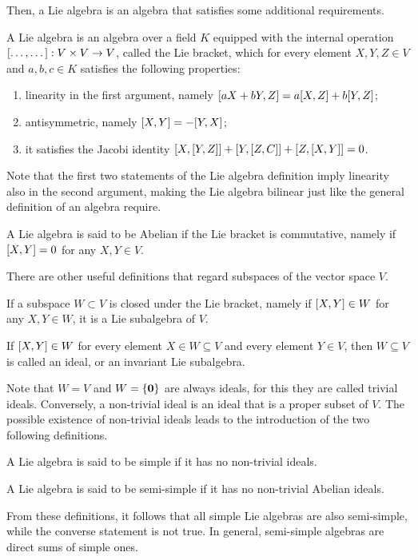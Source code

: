 Then, a Lie algebra is an algebra that satisfies some additional requirements.
\begin{defn}
    A Lie algebra is an algebra over a field $K$ equipped with the internal operation $[\dots,\dots] : V \times V \to V$, called the Lie bracket, which for every element $X,Y,Z \in V$ and $a,b,c \in K$ satisfies the following properties:
    \begin{enumerate}
        \item linearity in the first argument, namely $[aX + bY,Z] = a[X,Z] + b[Y,Z]$;
        \item antisymmetric, namely $[X,Y] = - [Y,X]$;
        \item it satisfies the Jacobi identity $[X,[Y,Z]] + [Y,[Z,C]] + [Z,[X,Y]] = 0$.
    \end{enumerate}
\end{defn}
Note that the first two statements of the Lie algebra definition imply linearity also in the second argument, making the Lie algebra bilinear just like the general definition of an algebra require.
\begin{defn}
    A Lie algebra is said to be Abelian if the Lie bracket is commutative, namely if $[X,Y] = 0$ for any $X,Y \in V$.
\end{defn}
There are other useful definitions that regard subspaces of the vector space $V$.
\begin{defn}
    If a subspace $W \subset V$ is closed under the Lie bracket, namely if $[X,Y] \in W$ for any $X,Y \in W$, it is a Lie subalgebra of $V$.
\end{defn}
\begin{defn}[ideal]
    If $[X,Y] \in W$ for every element $X \in W \subseteq V$ and every element $Y \in V$, then $W \subseteq V$ is called an ideal, or an invariant Lie subalgebra.
\end{defn}
Note that $W = V$ and $W = \{\bm{0}\}$ are always ideals, for this they are called trivial ideals. Conversely, a non-trivial ideal is an ideal that is a proper subset of $V$. The possible existence of non-trivial ideals leads to the introduction of the two following definitions.
\begin{defn}
    A Lie algebra is said to be simple if it has no non-trivial ideals.
\end{defn}
\begin{defn}
    A Lie algebra is said to be semi-simple if it has no non-trivial Abelian ideals.
\end{defn}
From these definitions, it follows that all simple Lie algebras are also semi-simple, while the converse statement is not true. In general, semi-simple algebras are direct sums of simple ones. 

